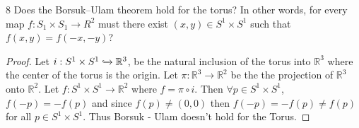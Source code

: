 \documentclass{article}
\newcommand*{\x}{\times}
\newcommand{\R}{\mathbb{R}}
\begin{document}
\begin{PROB}{8}\label{Problem 8.}
    Does the Borsuk–Ulam theorem hold for the torus? In other words, for every map
$f: S_1 \x S_1 \to R^2$ must there exist $(x,y) \in S^1 \times S^1$ such that $f(x,y)=f(-x,-y)$?
\end{PROB}
\begin{proof}
    Let $i : S^1 \times S^1 \xhookrightarrow{} \R^3$, be the natural inclusion of the torus into $\R^3$ where the center of the torus is the origin. Let $\pi: \R^3 \to \R^2$ be the the projection of $\R^3$ onto $\R^2$. Let $f : S^1 \times S^1 \to \R^2$ where $f = \pi \circ i$. Then $\forall p \in S^1 \times S^1$, $f(-p) = -f(p)$ and since $f(p) \neq (0, 0)$ then $f(-p) = -f(p) \neq f(p)$ for all $p \in S^1 \times S^1$. Thus Borsuk - Ulam doesn't hold for the Torus.   
\end{proof}

\bigskip
\end{document}
